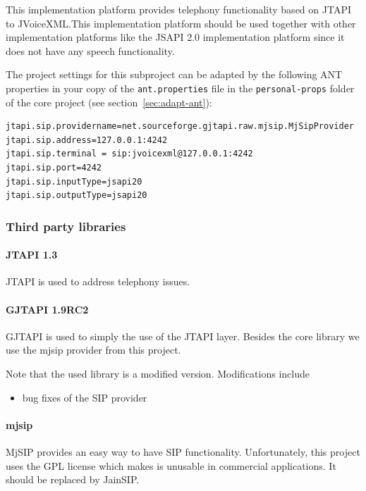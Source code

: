 \documentclass[11pt,a4paper]{article}
\begin{document}
This implementation platform provides telephony functionality based on JTAPI to
JVoiceXML.This implementation platform should be used together with other
implementation platforms like the JSAPI 2.0 implementation platform since it
does not have any speech functionality.

The project settings for this subproject can be adapted by the following ANT
properties in your copy of the \texttt{ant.properties} file in the
\texttt{personal-props} folder of the core project (see 
section~\ref{sec:adapt-ant}):
\begin{lstlisting}
jtapi.sip.providername=net.sourceforge.gjtapi.raw.mjsip.MjSipProvider
jtapi.sip.address=127.0.0.1:4242
jtapi.sip.terminal = sip:jvoicexml@127.0.0.1:4242
jtapi.sip.port=4242
jtapi.sip.inputType=jsapi20
jtapi.sip.outputType=jsapi20
\end{lstlisting}

\subsubsection{Third party libraries}
\label{sec:jtapi-third-party-libr}

\paragraph{JTAPI 1.3}

JTAPI is used to address telephony issues.

\paragraph{GJTAPI 1.9RC2}

GJTAPI is used to simply the use of the JTAPI layer. Besides the core library
we use the mjsip provider from this project.

Note that the used library is a modified version. Modifications include
\begin{itemize}
\item bug fixes of the SIP provider
\end{itemize}

\paragraph{mjsip}

MjSIP provides an easy way to have SIP functionality. Unfortunately, this
project uses the GPL license which makes is unusable in commercial
applications. It should be replaced by JainSIP.
\end{document}
